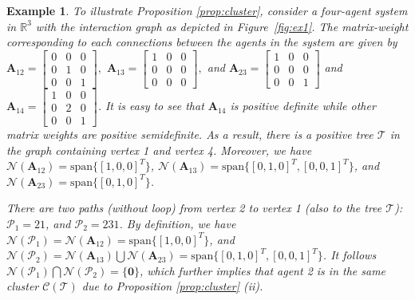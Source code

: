 \documentclass[draftclsnofoot,11pt,onecolumn]{IEEEtran}
\newtheorem{Example}{Example}
\newcommand{\m}[1]{\mathbf{#1}}
\newcommand{\mc}[1]{\mathcal{#1}}
\newcommand{\mb}[1]{\mathbb{#1}}
\begin{document}
\begin{Example}\label{ex:1} To illustrate Proposition \ref{prop:cluster}, consider a four-agent system in $\mb{R}^{3}$ with the interaction graph as depicted in Figure~\ref{fig:ex1}. The matrix-weight corresponding to each connections between the agents in the system are given by $\m{A}_{12}=\begin{bmatrix} 0&0&0\\0&1&0\\0&0&1 \end{bmatrix}, $
$\m{A}_{13}=\begin{bmatrix} 1&0&0\\0&0&0\\0&0&0 \end{bmatrix}, $ and $\m{A}_{23}=\begin{bmatrix} 1&0&0\\0&0&0\\0&0&1 \end{bmatrix}$ and $\m{A}_{14} = \begin{bmatrix} 1&0&0\\0&2&0\\0&0&1 \end{bmatrix}$. It is easy to see that $\m{A}_{14}$ is positive definite while other matrix weights are positive semidefinite. As a result, there is a positive tree $\mc{T}$ in the graph containing vertex 1 and vertex 4. Moreover, we have $\mc{N}(\m{A}_{12}) = \text{span} \{ [1,0,0]^T \}$, $\mc{N}(\m{A}_{13}) = \text{span} \{ [0,1,0]^T, [0,0,1]^T\}$, and $\mc{N}(\m{A}_{23}) = \text{span} \{ [0,1,0]^T \}$.

There are two paths (without loop) from vertex 2 to vertex 1 (also to the tree $\mc{T}$): $\mc{P}_1 = 21$, and $\mc{P}_2 = 231$. By definition, we have $\mc{N}(\mc{P}_1) = \mc{N}(\m{A}_{12}) = \text{span} \{ [1,0,0]^T \}$, and $\mc{N}(\mc{P}_2) =  \mc{N}(\m{A}_{13}) \bigcup \mc{N}(\m{A}_{23}) = \text{span} \{ [0,1,0]^T, [0,0,1]^T\}$. It follows $\mc{N}(\mc{P}_1) \bigcap \mc{N}(\mc{P}_2) = \{ \m{0} \}$, which further implies that agent 2 is in the same cluster  $\mc{C}(\mc{T})$ due to Proposition \ref{prop:cluster} (ii).



\end{Example}
\end{document}
